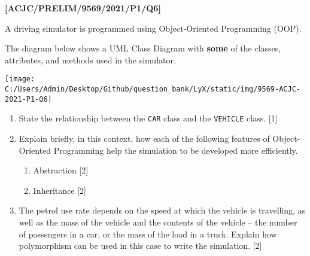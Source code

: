 \item \textbf{{[}ACJC/PRELIM/9569/2021/P1/Q6{]} }

A driving simulator is programmed using Object-Oriented Programming
(OOP).

The diagram below shows a UML Class Diagram with \textbf{some} of
the classes, attributes, and methods used in the simulator.
\noindent \begin{center}
\texttt{[image: C:/Users/Admin/Desktop/Github/question\_bank/LyX/static/img/9569-ACJC-2021-P1-Q6]}\quad{}
\par\end{center}
\begin{enumerate}
\item State the relationship between the \texttt{CAR} class and the \texttt{VEHICLE}
class. \hfill{}{[}1{]}
\item Explain briefly, in this context, how each of the following features
of Object-Oriented Programming help the simulation to be developed
more efficiently.
\begin{enumerate}
\item Abstraction \hfill{} {[}2{]}
\item Inheritance \hfill{}{[}2{]}
\end{enumerate}
\item The petrol use rate depends on the speed at which the vehicle is travelling,
as well as the mass of the vehicle and the contents of the vehicle
-- the number of passengers in a car, or the mass of the load in
a truck. Explain how polymorphism can be used in this case to write
the simulation. \hfill{}{[}2{]}
\end{enumerate}